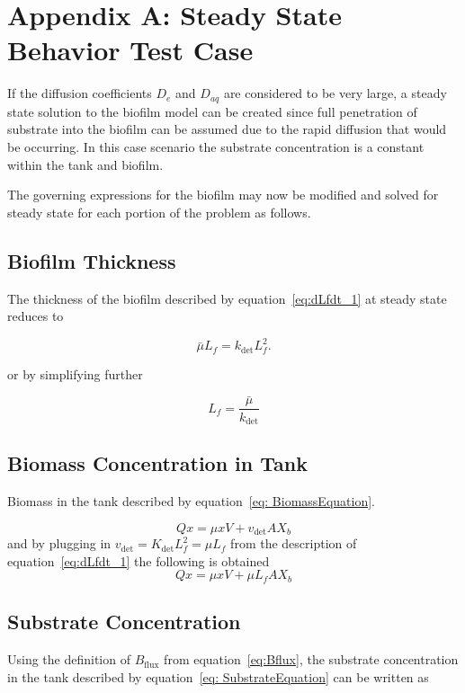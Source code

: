 \documentclass[letterpaper, twoside]{article}
\numberwithin{equation}{section}
\begin{document}
\section{Appendix A: Steady State Behavior Test Case}\label{Steady State}

If the diffusion coefficients $D_e$ and $D_{aq}$ are considered to be very large, a steady state solution to the biofilm model can be created since full penetration of substrate into the biofilm can be assumed due to the rapid diffusion that would be occurring. In this case scenario the substrate concentration is a constant within the tank and biofilm.

The governing expressions for the biofilm may now be modified and solved for steady state for each portion of the problem as follows.

\subsection{Biofilm Thickness}
The thickness of the biofilm described by equation~\ref{eq:dLfdt_1} at steady state reduces to 

\begin{equation*}
   {\bar\mu L_f}={k_{\mathrm{det}}L_f^2}.
\end{equation*}
 
 or by simplifying further
 
 \begin{equation}
  \label{eq:Lfsteady}
  {L_f}=\frac{\bar\mu}{k_{\mathrm{det}}}
\end{equation}

\subsection{Biomass Concentration in Tank}
Biomass in the tank described by equation~\ref{eq: BiomassEquation}. 

\begin{equation*} 
  Qx = \mu xV +v_{\mathrm{det}} A X_b
\end{equation*}
and by plugging in $v_{\mathrm{det}}= K_\mathrm{det} L_f^2 = \mu L_f$ from the description of equation~\ref{eq:dLfdt_1} the following is obtained
\begin{equation}
 \label{eq:biomass steady}
  Qx = \mu xV +\mu L_f A X_b
\end{equation}

\subsection{Substrate Concentration}
Using the definition of $B_{\mathrm{flux}}$ from equation~\ref{eq:Bflux}, the substrate concentration in the tank described by equation~\ref{eq: SubstrateEquation} can be written as
\end{document}
